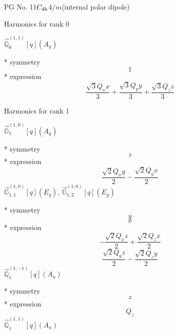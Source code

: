 \documentclass[fleqn,8pt]{jsarticle}
\begin{document}
\setcounter{MaxMatrixCols}{32}

\renewcommand{\tablename}{Table~}
\renewcommand{\figurename}{Figure~}
\begin{center}
\LARGE
PG No. 11\quad$C_{\rm 4h}$\quad$4/m$\quad[ tetragonal ] (internal polar dipole)
\end{center}

\noindent * Harmonics for rank 0

\noindent\quad $\vec{\mathbb{Q}}_{0}^{(1,1)}[q](A_{g})$

\noindent\quad ** symmetry
\begin{dmath*}
1
\end{dmath*}
\noindent\quad ** expression
\begin{dmath*}
\frac{\sqrt{3} Q_{x} x}{3} + \frac{\sqrt{3} Q_{y} y}{3} + \frac{\sqrt{3} Q_{z} z}{3}
\end{dmath*}

\noindent * Harmonics for rank 1

\noindent\quad $\vec{\mathbb{G}}_{1}^{(1,0)}[q](A_{g})$

\noindent\quad ** symmetry
\begin{dmath*}
z
\end{dmath*}
\noindent\quad ** expression
\begin{dmath*}
\frac{\sqrt{2} Q_{x} y}{2} - \frac{\sqrt{2} Q_{y} x}{2}
\end{dmath*}
\noindent\quad $\vec{\mathbb{G}}_{1,1}^{(1,0)}[q](E_{g})$, $\vec{\mathbb{G}}_{1,2}^{(1,0)}[q](E_{g})$

\noindent\quad ** symmetry
\begin{dmath*}
y
\end{dmath*}
\begin{dmath*}
x
\end{dmath*}
\noindent\quad ** expression
\begin{dmath*}
- \frac{\sqrt{2} Q_{x} z}{2} + \frac{\sqrt{2} Q_{z} x}{2}
\end{dmath*}
\begin{dmath*}
\frac{\sqrt{2} Q_{y} z}{2} - \frac{\sqrt{2} Q_{z} y}{2}
\end{dmath*}
\noindent\quad $\vec{\mathbb{Q}}_{1}^{(1,-1)}[q](A_{u})$

\noindent\quad ** symmetry
\begin{dmath*}
z
\end{dmath*}
\noindent\quad ** expression
\begin{dmath*}
Q_{z}
\end{dmath*}
\noindent\quad $\vec{\mathbb{Q}}_{1}^{(1,1)}[q](A_{u})$
\end{document}
